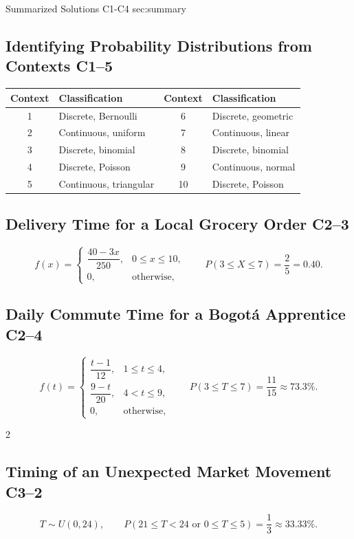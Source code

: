 	\sectionScored
	{Summarized Solutions}
	{C1-C4}
	{sec:summary}
	{
		\subsection{Identifying Probability Distributions from Contexts \hfill C1--5}
		\begin{center}
			\begin{tabular}{cl@{\qquad}cl}
				\toprule
				Context & Classification & Context & Classification \\
				\midrule
				1 & Discrete, Bernoulli & 6 & Discrete, geometric \\
				2 & Continuous, uniform & 7 & Continuous, linear \\
				3 & Discrete, binomial & 8 & Discrete, binomial \\
				4 & Discrete, Poisson & 9 & Continuous, normal \\
				5 & Continuous, triangular & 10 & Discrete, Poisson \\
				\bottomrule
			\end{tabular}
		\end{center}

		\subsection{Delivery Time for a Local Grocery Order \hfill C2--3}
		\[
		f(x)=
		\begin{cases}
			\dfrac{40-3x}{250},&0\le x\le10,\\[1mm]
			0,&\text{otherwise},
		\end{cases}
		\qquad
		\boxed{P(3\le X\le7)=\frac25=0.40}.
		\]

		\subsection{Daily Commute Time for a Bogotá Apprentice \hfill C2--4}
		\[
		f(t)=
		\begin{cases}
			\dfrac{t-1}{12},&1\le t\le4,\\[1mm]
			\dfrac{9-t}{20},&4<t\le9,\\[1mm]
			0,&\text{otherwise},
		\end{cases}
		\qquad
		\boxed{P(3\le T\le7)=\frac{11}{15}\approx73.3\%}.
		\]

		\begin{multicols}{2}
			\subsection{Timing of an Unexpected Market Movement \hfill C3--2}
			\[
			T\sim U(0,24),
			\qquad
			\boxed{P(21\le T<24\text{ or }0\le T\le5)
			=\frac13\approx33.33\%}.
			\]


\end{multicols}}

